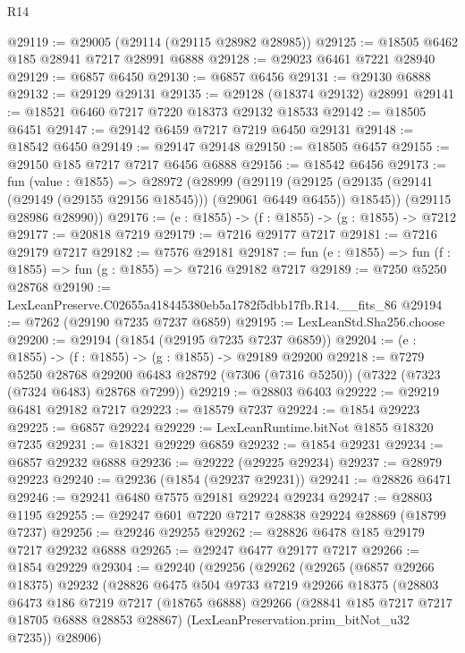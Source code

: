 \begin{lexlean}{R14}
\begin{coremodule}
@29119 := @29005 (@29114 (@29115 @28982 @28985))
@29125 := @18505 @6462 @185 @28941 @7217 @28991 @6888
@29128 := @29023 @6461 @7221 @28940
@29129 := @6857 @6450
@29130 := @6857 @6456
@29131 := @29130 @6888
@29132 := @29129 @29131
@29135 := @29128 (@18374 @29132) @28991
@29141 := @18521 @6460 @7217 @7220 @18373 @29132 @18533
@29142 := @18505 @6451
@29147 := @29142 @6459 @7217 @7219 @6450 @29131
@29148 := @18542 @6450
@29149 := @29147 @29148
@29150 := @18505 @6457
@29155 := @29150 @185 @7217 @7217 @6456 @6888
@29156 := @18542 @6456
@29173 := fun (value : @1855) =>
  @28972
    (@28999
      (@29119
        (@29125 (@29135 (@29141 (@29149 (@29155 @29156 @18545))) (@29061 @6449 @6455)) @18545))
      (@29115 @28986 @28990))
@29176 := (e : @1855) -> (f : @1855) -> (g : @1855) -> @7212
@29177 := @20818 @7219
@29179 := @7216 @29177 @7217
@29181 := @7216 @29179 @7217
@29182 := @7576 @29181
@29187 := fun (e : @1855) => fun (f : @1855) => fun (g : @1855) => @7216 @29182 @7217
@29189 := @7250 @5250 @28768
@29190 := LexLeanPreserve.C02655a418445380eb5a1782f5dbb17fb.R14.__fits_86
@29194 := @7262 (@29190 @7235 @7237 @6859)
@29195 := LexLeanStd.Sha256.choose
@29200 := @29194 (@1854 (@29195 @7235 @7237 @6859))
@29204 := (e : @1855) -> (f : @1855) -> (g : @1855) -> @29189 @29200
@29218 := @7279
    @5250
    @28768
    @29200
    @6483
    @28792
    (@7306 (@7316 @5250))
    (@7322 (@7323 (@7324 @6483) @28768 @7299))
@29219 := @28803 @6403
@29222 := @29219 @6481 @29182 @7217
@29223 := @18579 @7237
@29224 := @1854 @29223
@29225 := @6857 @29224
@29229 := LexLeanRuntime.bitNot @1855 @18320 @7235
@29231 := @18321 @29229 @6859
@29232 := @1854 @29231
@29234 := @6857 @29232 @6888
@29236 := @29222 (@29225 @29234)
@29237 := @28979 @29223
@29240 := @29236 (@1854 (@29237 @29231))
@29241 := @28826 @6471
@29246 := @29241 @6480 @7575 @29181 @29224 @29234
@29247 := @28803 @1195
@29255 := @29247 @601 @7220 @7217 @28838 @29224 @28869 (@18799 @7237)
@29256 := @29246 @29255
@29262 := @28826 @6478 @185 @29179 @7217 @29232 @6888
@29265 := @29247 @6477 @29177 @7217
@29266 := @1854 @29229
@29304 := @29240
    (@29256
      (@29262
        (@29265
          (@6857 @29266 @18375)
          @29232
          (@28826
            @6475
            @504
            @9733
            @7219
            @29266
            @18375
            (@28803
              @6473
              @186
              @7219
              @7217
              (@18765 @6888)
              @29266
              (@28841 @185 @7217 @7217 @18705 @6888 @28853 @28867)
              (LexLeanPreservation.prim_bitNot_u32 @7235))
            @28906)

\end{coremodule}
\end{lexlean}
